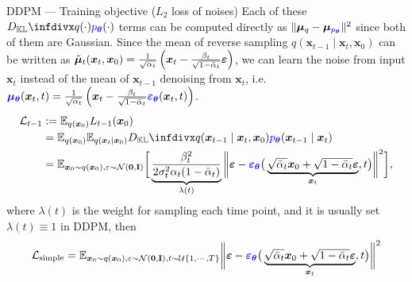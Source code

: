 \documentclass[10pt]{beamer}
\begin{document}
\begin{frame}{DDPM --- \normalsize Training objective ($L_2$ loss of noises)}
    Each of these $\infdiv{q(\cdot)}{\textcolor{blue}{p_{\bm{\theta}}}(\cdot)}$ terms can be computed directly as $\|\bm{\mu}_q - \bm{\mu}_{\textcolor{blue}{p_{\bm{\theta}}}}\|^2$ since both of them are Gaussian. Since the mean of reverse sampling $q(\bm{x}_{t-1}\mid\bm{x}_t,\bm{x}_0)$ can be written as 
    $\Tilde{\bm{\mu}}_t(\bm{x}_t,\bm{x}_0) = \frac{1}{\sqrt{\alpha_t}}\left(
        \bm{x}_t - \frac{\beta_t}{\sqrt{1-\bar{\alpha}_t}}\bm{\varepsilon}
    \right)
    $,
    we can learn the noise from input $\bm{x}_{t}$ instead of the mean of $\bm{x}_{t-1}$ denoising from $\bm{x}_{t}$, i.e.
    $\textcolor{blue}{\bm{\mu}_{\bm{\theta}}}(\bm{x}_t,t)
    = \frac{1}{\sqrt{\alpha_t}}\left(
        \bm{x}_t - \frac{\beta_t}{\sqrt{1-\bar{\alpha}_t}}\textcolor{blue}{\bm{\varepsilon}_{\bm{\theta}}}(\bm{x}_t,t)
    \right)$.
    {\small\begin{align*}
        \mathcal{L}_{t-1} & := \mathbb{E}_{q(\bm{x}_0)}L_{t-1}(\bm{x}_0) \notag \\
        & = \mathbb{E}_{q(\bm{x}_0)} \mathbb{E}_{q(\bm{x}_{t}\mid\bm{x}_0)} \infdiv{q(\bm{x}_{t-1}\mid\bm{x}_t,\bm{x}_0)}{\textcolor{blue}{p_{\bm{\theta}}}(\bm{x}_{t-1}\mid \bm{x}_t)} \notag \\
        & = \mathbb{E}_{\bm{x}_0\sim q(\bm{x}_0),\varepsilon\sim\mathcal{N}(\bm{0},\mathbf{I})}\bigg[
            \underbrace{\frac{\beta_t^2}{2\sigma_t^2\alpha_t(1-\bar{\alpha}_t)}}_{\lambda(t)}\bigg\|
                \bm{\varepsilon} - \textcolor{blue}{\bm{\varepsilon}_{\bm{\theta}}}\big(\underbrace{
                    \sqrt{\bar{\alpha}_t}\bm{x}_0 + \sqrt{1-\bar{\alpha}_t}\bm{\varepsilon}
                }_{\bm{x}_t}, t\big)
            \bigg\|^2
        \bigg],\label{eq:ddpmmseloss}
    \end{align*}}
    where $\lambda(t)$ is the weight for sampling each time point, and it is usually set $\lambda(t)\equiv 1$ in DDPM, then
    {\small\begin{gather}
        \mathcal{L}_\text{simple}
        = \mathbb{E}_{\bm{x}_0\sim q(\bm{x}_0),\varepsilon\sim\mathcal{N}(\bm{0},\mathbf{I}),t\sim\mathcal{U}\{1,\cdots,T\}}
        \bigg\|
            \bm{\varepsilon} - \textcolor{blue}{\bm{\varepsilon}_{\bm{\theta}}}\big(\underbrace{
                \sqrt{\bar{\alpha}_t}\bm{x}_0 + \sqrt{1-\bar{\alpha}_t}\bm{\varepsilon}
            }_{\bm{x}_t}, t\big)
        \bigg\|^2
    \end{gather}}
\end{frame}
\end{document}

